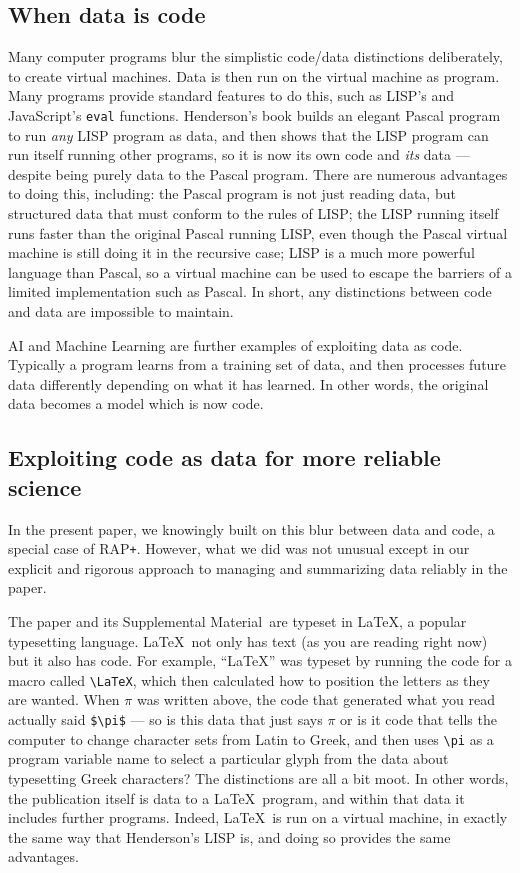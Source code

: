 \documentclass[10pt,a4paper]{article}
\def\supplement{Supplemental Material}
\def\RAPstarp#1{RAP{\tt +}#1}
\begin{document}
\subsection{When data is code}
{Many computer programs blur the simplistic code/data distinctions deliberately, to create virtual machines. Data is then run on the virtual machine as program. Many programs provide standard features to do this, such as LISP's and JavaScript's \texttt{eval} functions. Henderson's book \cite{henderson} builds an elegant Pascal program to run \emph{any\/} LISP program as data, and then shows that the LISP program can run itself running other programs, so it is now its own code and \emph{its\/} data --- despite being purely data to the Pascal program. There are numerous advantages to doing this, including: the Pascal program is not just reading data, but structured data that must conform to the rules of LISP; the LISP running itself runs faster than the original Pascal running LISP, even though the Pascal virtual machine is still doing it in the recursive case; LISP is a much more powerful language than Pascal, so a virtual machine can be used to escape the barriers of a limited implementation such as Pascal. In short, any distinctions between code and data are impossible to maintain.}

AI and Machine Learning are further examples of exploiting data as code. Typically a program learns from a training set of data, and then processes future data differently depending on what it has learned. In other words, the original data becomes a model which is now code.

\subsection{Exploiting code as data for more reliable science}
In the present paper, we knowingly built on this blur between data and code, a special case of \RAPstarp. However, what we did was not unusual except in our explicit and rigorous approach to managing and summarizing data reliably in the paper.

The paper and its \supplement\ are typeset in \LaTeX, a popular typesetting language. \LaTeX\ not only has text (as you are reading right now) but it also has code. For example, ``\LaTeX'' was typeset by running the code for a macro called \verb|\LaTeX|, which then calculated how to position the letters as they are wanted. When $\pi$ was written above, the code that generated what you read actually said \verb|$\pi$| --- so is this data that just says $\pi$ or is it code that tells the computer to change character sets from Latin to Greek, and then uses \verb|\pi| as a program variable name to select a particular glyph from the data about typesetting Greek characters? The distinctions are all a bit moot. In other words, the publication itself is data to a \LaTeX\ program, and within that data it includes further programs. Indeed, \LaTeX\ is run on a virtual machine, in exactly the same way that Henderson's LISP is, and doing so provides the same advantages.
\end{document}
